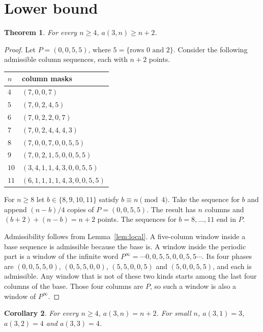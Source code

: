 \documentclass[11pt]{article}
\newtheorem{theorem}{Theorem}
\newtheorem{corollary}[theorem]{Corollary}
\theoremstyle{definition}
\theoremstyle{remark}
\begin{document}
\section{Lower bound}

\begin{theorem}\label{thm:lower}
For every $n\ge 4$, $a(3,n)\ge n+2$.
\end{theorem}

\begin{proof}
Let $P=(0,0,5,5)$, where $5=\{\text{rows }0\text{ and }2\}$. Consider the following admissible column sequences, each with $n+2$ points.

\begin{center}
\begin{tabular}{@{}ll@{}}
\toprule
$n$ & column masks \\
\midrule
$4$ & $(7,0,0,7)$ \\
$5$ & $(7,0,2,4,5)$ \\
$6$ & $(7,0,2,2,0,7)$ \\
$7$ & $(7,0,2,4,4,4,3)$ \\
$8$ & $(7,0,0,7,0,0,5,5)$ \\
$9$ & $(7,0,2,1,5,0,0,5,5)$ \\
$10$ & $(3,4,1,1,4,3,0,0,5,5)$ \\
$11$ & $(6,1,1,1,1,4,3,0,0,5,5)$ \\
\bottomrule
\end{tabular}
\end{center}

For $n\ge 8$ let $b\in\{8,9,10,11\}$ satisfy $b\equiv n\pmod 4$. Take the sequence for $b$ and append $(n-b)/4$ copies of $P=(0,0,5,5)$. The result has $n$ columns and $(b+2)+(n-b)=n+2$ points. The sequences for $b=8,\dots,11$ end in $P$.

Admissibility follows from Lemma~\ref{lem:local}. A five-column window inside a base sequence is admissible because the base is. A window inside the periodic part is a window of the infinite word $P^\infty=\cdots 0,0,5,5,0,0,5,5\cdots$. Its four phases are $(0,0,5,5,0)$, $(0,5,5,0,0)$, $(5,5,0,0,5)$ and $(5,0,0,5,5)$, and each is admissible. Any window that is not of these two kinds starts among the last four columns of the base. Those four columns are $P$, so such a window is also a window of $P^\infty$.
\end{proof}

\begin{corollary}\label{cor:main}
For every $n\ge 4$, $a(3,n)=n+2$. For small $n$, $a(3,1)=3$, $a(3,2)=4$ and $a(3,3)=4$.
\end{corollary}
\end{document}
